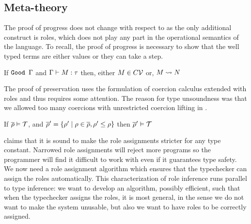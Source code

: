 \documentclass[screen,nonacm,manuscript,review]{acmart} %
\begin{document}
\subsection{Meta-theory}\label{sec:sfr-metatheory}
The proof of progress does not change with respect to \SFC as the only
additional construct is roles, which does not play any part in the
operational semantics of the language. To recall, the proof of
progress is necessary to show that the well typed terms are either
values or they can take a step.
\begin{theorem}\label{lem:sfr-progress}
 If $\texttt{Good~}\Gamma$ and $\Gamma \vdash M : \tau$ then, either $M \in C\mathcal{V}$ or, $M \rightsquigarrow N$
\end{theorem}
The proof of preservation uses the formulation of coercion calculus
extended with roles and thus requires some attention. The reason for
type unsoundness was that we allowed too many coercions with
unrestricted coercion lifting in \SFC.
\begin{lemma}\label{lem:role-narrowing}
If $\overline{\rho} \mathrel{\vDash} \mathcal{T}$, and $\overline{\rho}' = \{\rho'
  \mid \rho \in \overline{\rho}, \rho' \leq \rho\}$ then $\overline{\rho}' \mathrel{\vDash} \mathcal{T}$
\end{lemma}
 claims that it is sound to make the role
assignments stricter for any type constant. Narrowed role assignments
will reject more programs so the programmer will find it difficult to
work with even if it guarantees type safety. We now need a role
assignment algorithm which ensures that the typechecker can assign the
roles automatically. This characterization of role inference runs
parallel to type inference: we want to develop an algorithm, possibly
efficient, such that when the typechecker assigns the roles, it is
most general, in the sense we do not want to make the system unusable,
but also we want to have roles to be correctly assigned.
\end{document}
